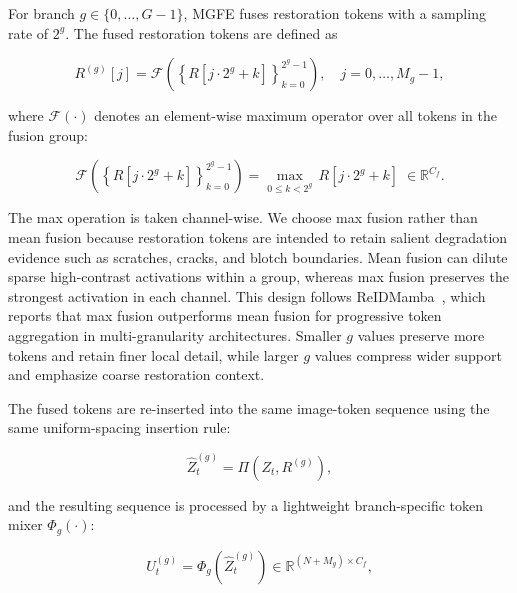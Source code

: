 For branch $g \in \{0,\ldots,G-1\}$, MGFE fuses restoration tokens with a sampling rate of $2^g$. The fused restoration tokens are defined as

\begin{equation}
R^{(g)}[j] =
\mathcal{F}\!\left(
\left\{R[j{\cdot}2^g+k]\right\}_{k=0}^{2^g-1}
\right),\quad
j = 0,\ldots,M_g-1,
\end{equation}

where $\mathcal{F}(\cdot)$ denotes an element-wise maximum operator over all tokens in the fusion group:

\begin{equation}
\mathcal{F}\!\left(
\left\{R[j\cdot2^g+k]\right\}_{k=0}^{2^g-1}
\right)
= \max_{0\le k < 2^g}\,R[j\cdot2^g+k]\;\in\mathbb{R}^{C_f}.
\label{eq:max_fusion}
\end{equation}

The max operation is taken channel-wise. We choose max fusion rather than mean fusion because restoration tokens are intended to retain salient degradation evidence such as scratches, cracks, and blotch boundaries. Mean fusion can dilute sparse high-contrast activations within a group, whereas max fusion preserves the strongest activation in each channel. This design follows ReIDMamba~\cite{gu2025reidmamba}, which reports that max fusion outperforms mean fusion for progressive token aggregation in multi-granularity architectures. Smaller $g$ values preserve more tokens and retain finer local detail, while larger $g$ values compress wider support and emphasize coarse restoration context.

The fused tokens are re-inserted into the same image-token sequence using the same uniform-spacing insertion rule:

\begin{equation}
\widehat{Z}_t^{(g)} = \Pi\!\left(Z_t,R^{(g)}\right),
\end{equation}

and the resulting sequence is processed by a lightweight branch-specific token mixer $\Phi_g(\cdot)$:

\begin{equation}
U_t^{(g)} = \Phi_g\!\left(\widehat{Z}_t^{(g)}\right)
\in \mathbb{R}^{(N+M_g)\times C_f},
\end{equation}

